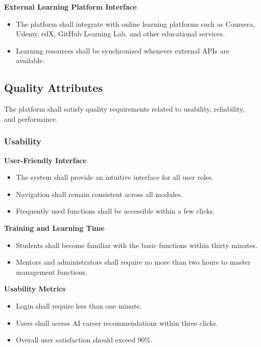 \textbf{External Learning Platform Interface}

\begin{itemize}
    \item The platform shall integrate with online learning platforms such as Coursera, Udemy, edX, GitHub Learning Lab, and other educational services.
    \item Learning resources shall be synchronized whenever external APIs are available.
\end{itemize}

\subsection{Quality Attributes}

The platform shall satisfy quality requirements related to usability, reliability, and performance.
\subsubsection{Usability}

\textbf{User-Friendly Interface}

\begin{itemize}
    \item The system shall provide an intuitive interface for all user roles.
    \item Navigation shall remain consistent across all modules.
    \item Frequently used functions shall be accessible within a few clicks.
\end{itemize}

\textbf{Training and Learning Time}

\begin{itemize}
    \item Students shall become familiar with the basic functions within thirty minutes.
    \item Mentors and administrators shall require no more than two hours to master management functions.
\end{itemize}

\textbf{Usability Metrics}

\begin{itemize}
    \item Login shall require less than one minute.
    \item Users shall access AI career recommendations within three clicks.
    \item Overall user satisfaction should exceed 90\%.
\end{itemize}

